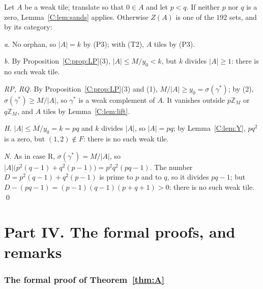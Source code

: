 \documentclass[11pt,a4paper]{amsart}
\theoremstyle{definition}
\theoremstyle{remark}
\newcommand{\Z}{\mathbb{Z}}
\newcommand{\gs}{\gamma}
\begin{document}
Let $A$ be a weak tile; translate so that $0\in A$ and let $p<q$. If neither $p$ nor $q$ is a zero,
Lemma~\ref{C:lem:sands} applies. Otherwise $Z(A)$ is one of the $192$ sets, and by its category:

\emph{a.} No orphan, so $|A|=k$ by (P3); with (T2), $A$ tiles by (P3).

\emph{b.} By Proposition~\ref{C:prop:LP}(3), $|A|\le M/y_0<k$, but $k$ divides $|A|\ge1$: there is no such weak
tile.

\emph{RP, RQ.} By Proposition~\ref{C:prop:LP}(3) and (1), $M/|A|\ge y_0=\sigma(\gs^*)$; by (2),
$\sigma(\gs^*)\ge M/|A|$, so $\gs^*$ is a weak complement of $A$. It vanishes outside $p\Z_M$ or $q\Z_M$, and $A$
tiles by Lemma~\ref{C:lem:lift}.

\emph{H.} $|A|\le M/y_0=k=pq$ and $k$ divides $|A|$, so $|A|=pq$; by Lemma~\ref{C:lem:Y}, $pq^2$ is a zero, but
$(1,2)\notin F$: there is no such weak tile.

\emph{N.} As in case R, $\sigma(\gs^*)=M/|A|$, so $|A|\bigl(p^2(q-1)+q^2(p-1)\bigr)=p^2q^2(pq-1)$. The number
$D=p^2(q-1)+q^2(p-1)$ is prime to $p$ and to $q$, so it divides $pq-1$; but $D-(pq-1)=(p-1)(q-1)(p+q+1)>0$:
there is no such weak tile. \qed

\label{C:sec:proofC}


\part*{Part IV. The formal proofs, and remarks}

\section{The formal proof of Theorem~\ref{thm:A}}\label{Y:sec:lean}
\end{document}
